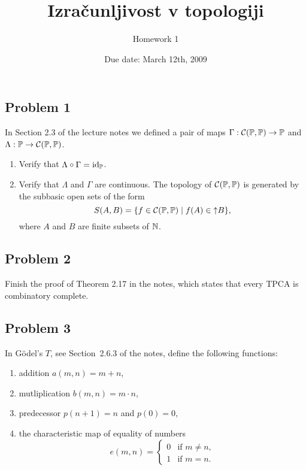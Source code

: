 \documentclass[a4paper,11pt]{article}
\begin{document}
\title{Izračunljivost v topologiji}
\author{Homework 1}
\date{Due date: March 12th, 2009}

\maketitle

\subsection*{Problem 1}

In Section 2.3 of the lecture notes we defined a pair of maps $\Gamma
: \mathcal{C}(\mathbb{P}, \mathbb{P}) \to \mathbb{P}$ and $\Lambda : \mathbb{P} \to
\mathcal{C}(\mathbb{P}, \mathbb{P})$.
%
\begin{enumerate}
\item Verify that $\Lambda \circ \Gamma = \mathrm{id}_{\mathbb{P}}$.
\item Verify that $\Lambda$ and $\Gamma$ are continuous. The topology
  of $\mathcal{C}(\mathbb{P}, \mathbb{P})$ is generated by the subbasic open
  sets of the form
  \begin{equation*}
    S(A,B) = \{f \in \mathcal{C}(\mathbb{P}, \mathbb{P}) \mid f(A) \in {\uparrow}B\},
  \end{equation*}
  where $A$ and $B$ are finite subsets of $\mathbb{N}$.
\end{enumerate}


\subsection*{Problem 2}

Finish the proof of Theorem 2.17 in the notes, which states that every
TPCA is combinatory complete.


\subsection*{Problem 3}

In G\"odel's $T$, see Section~2.6.3 of the notes, define the following
functions:
%
\begin{enumerate}
\item addition $a(m,n) = m + n$,
\item mutliplication $b(m,n) = m \cdot n$,
\item predecessor $p(n+1) = n$ and $p(0) = 0$,
\item the characteristic map of equality of numbers
  \begin{equation*}
    e(m,n) =
    \begin{cases}
      0 & \text{if $m \neq n$},\\
      1 & \text{if $m = n$.}
    \end{cases}
  \end{equation*}
\end{enumerate}
\end{document}
